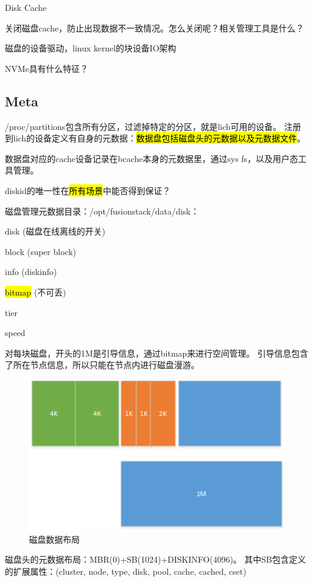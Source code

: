 Disk Cache

关闭磁盘cache，防止出现数据不一致情况。怎么关闭呢？相关管理工具是什么？

磁盘的设备驱动，linux kernel的块设备IO架构

NVMe具有什么特征？

\subsection{Meta}

/proc/partitions包含所有分区，过滤掉特定的分区，就是lich可用的设备。
注册到lich的设备定义有自身的元数据：\hl{数据盘包括磁盘头的元数据以及元数据文件}。

数据盘对应的cache设备记录在bcache本身的元数据里，通过sys fs，以及用户态工具管理。

diskid的唯一性在\hl{所有场景}中能否得到保证？

磁盘管理元数据目录：/opt/fusionstack/data/disk：
\begin{compactitem}
\item disk (磁盘在线离线的开关)
\item block (super block)
\item info (diskinfo)
\item \hl{bitmap} (不可丢)
\item tier
\item speed
\end{compactitem}

对每块磁盘，开头的1M是引导信息，通过bitmap来进行空间管理。
引导信息包含了所在节点信息，所以只能在节点内进行磁盘漫游。

\begin{figure}[h]
    \centering
    \includegraphics{../images/disk_layout.png}
    \caption{磁盘数据布局}
\end{figure}

磁盘头的元数据布局：MBR(0)+SB(1024)+DISKINFO(4096)。
其中SB包含定义的扩展属性：(cluster, node, type, disk, pool, cache, cached, cset)

